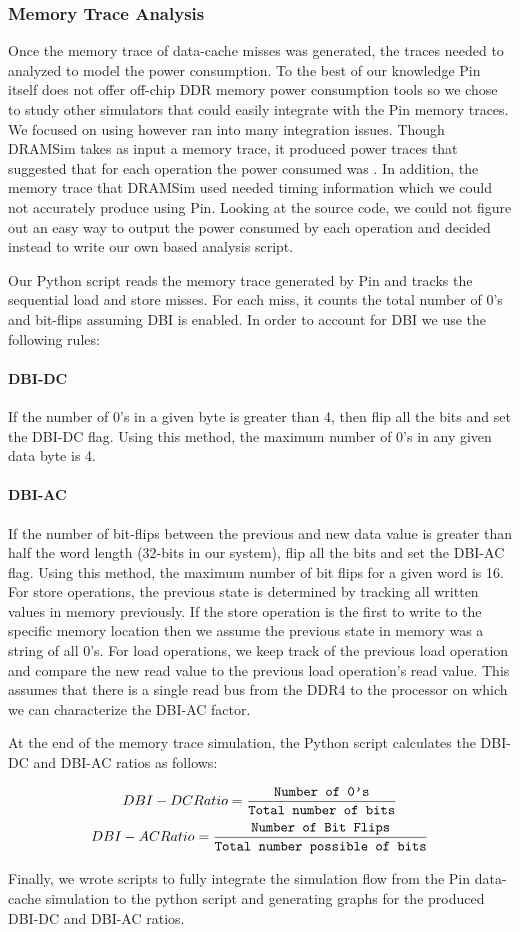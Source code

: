 \subsubsection{Memory Trace Analysis}
Once the memory trace of data-cache misses was generated, the traces needed to
analyzed to model the power consumption. To the best of our knowledge Pin
itself does not offer off-chip DDR memory power consumption tools so we chose
to study other simulators that could easily integrate with the Pin memory
traces. We focused on using  \cite{dram-sim} however ran into many
integration issues. Though DRAMSim takes as input a memory trace, it produced
power traces that suggested that for each operation the power consumed was
. In addition, the memory trace that DRAMSim used needed timing
information which we could not accurately produce using Pin. Looking at the
source code, we could not figure out an easy way to output the power consumed
by each operation and decided instead to write our own  based
analysis script.

Our Python script reads the memory trace generated by Pin and tracks the
sequential load and store misses. For each miss, it counts the total number
of $0$'s and bit-flips assuming DBI is enabled. In order to account for DBI we
use the following rules:

\paragraph{DBI-DC} If the number of $0$'s in a given byte is greater than 4,
then flip all the bits and set the DBI-DC flag. Using this method, the maximum
number of $0$'s in any given data byte is 4.

\paragraph{DBI-AC} If the number of bit-flips between the previous and new data
value is greater than half the word length (32-bits in our system), flip all
the bits and set the DBI-AC flag. Using this method, the maximum number of bit
flips for a given word is 16. For store operations, the previous state is
determined by tracking all written values in memory previously. If the store
operation is the first to write to the specific memory location then we assume
the previous state in memory was a string of all $0$'s. For load operations, we
keep track of the previous load operation and compare the new read value to the
previous load operation's read value. This assumes that there is a single read
bus from the DDR4 to the processor on which we can characterize the DBI-AC
factor.

At the end of the memory trace simulation, the Python script calculates the
DBI-DC and DBI-AC ratios as follows:

$$DBI-DC Ratio = \frac{\texttt{Number of 0's}}{\texttt{Total number of bits}}$$
$$DBI-AC Ratio = \frac{\texttt{Number of Bit Flips}}{\texttt{Total number possible of bits}}$$

Finally, we wrote  scripts to fully integrate the simulation flow from
the Pin data-cache simulation to the python script and generating graphs for
the produced DBI-DC and DBI-AC ratios.
